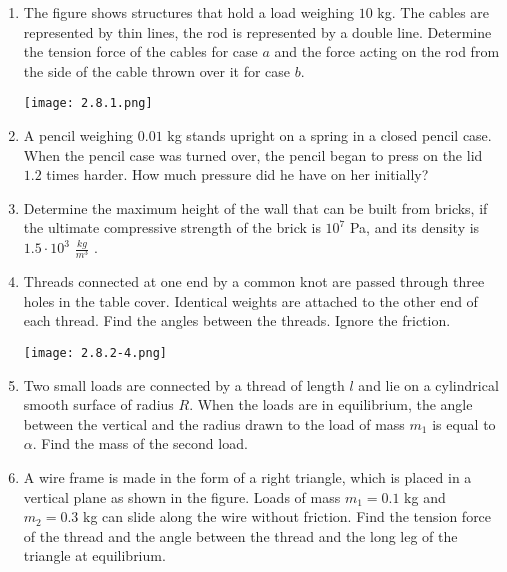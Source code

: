 \documentclass{article}
\begin{document}
\begin{enumerate}[label=2.8.\arabic*]



\item The figure shows structures that hold a load weighing $10$ kg. The cables are represented by thin lines, the rod is represented by a double line. Determine the tension force of the cables for case $a$ and the force acting on the rod from the side of the cable thrown over it for case $b$.

\begin{center}
    \texttt{[image: 2.8.1.png]}
\end{center}

\item A pencil weighing $0.01$ kg stands upright on a spring in a closed pencil case. When the pencil case was turned over, the pencil began to press on the lid $1.2$ times harder. How much pressure did he have on her initially?

\item Determine the maximum height of the wall that can be built from bricks, if the ultimate compressive strength of the brick is $10^7$ Pa, and its density is $1.5 \cdot 10^3$ $\frac{kg}{m^3}$ .

\item Threads connected at one end by a common knot are passed through three holes in the table cover. Identical weights are attached to the other end of each thread. Find the angles between the threads. Ignore the friction.

\begin{center}
    \texttt{[image: 2.8.2-4.png]}
\end{center}

\item Two small loads are connected by a thread of length $l$ and lie on a cylindrical smooth surface of radius $R$. When the loads are in equilibrium, the angle between the vertical and the radius drawn to the load of mass $m_1$ is equal to $\alpha$. Find the mass of the second load.

\item A wire frame is made in the form of a right triangle, which is placed in a vertical plane as shown in the figure. Loads of mass $m_1 = 0.1$ kg and $m_2 = 0.3$ kg can slide along the wire without friction. Find the tension force of the thread and the angle between the thread and the long leg of the triangle at equilibrium.


\end{enumerate}
\end{document}
